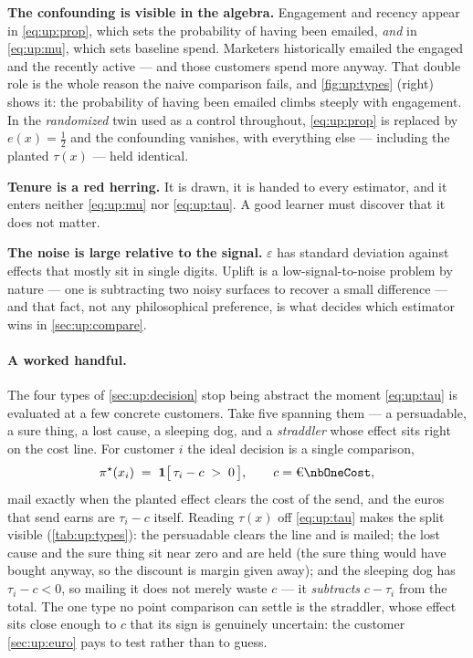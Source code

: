 \textbf{The confounding is visible in the algebra.} Engagement and recency appear in
\cref{eq:up:prop}, which sets the probability of having been emailed, \emph{and} in
\cref{eq:up:mu}, which sets baseline spend. Marketers historically emailed the engaged and the
recently active --- and those customers spend more anyway. That double role is the whole reason
the naive comparison fails, and \cref{fig:up:types} (right) shows it: the probability of having
been emailed climbs steeply with engagement. In the \emph{randomized} twin used as a control
throughout, \cref{eq:up:prop} is replaced by $e(x) = \tfrac12$ and the confounding vanishes,
with everything else --- including the planted $\tau(x)$ --- held identical.

\textbf{Tenure is a red herring.} It is drawn, it is handed to every estimator, and it enters
neither \cref{eq:up:mu} nor \cref{eq:up:tau}. A good learner must discover that it does not
matter.

\textbf{The noise is large relative to the signal.} $\varepsilon$ has standard deviation
 against effects that mostly sit in single digits. Uplift is a
low-signal-to-noise problem by nature --- one is subtracting two noisy surfaces to recover a
small difference --- and that fact, not any philosophical preference, is what decides which
estimator wins in \cref{sec:up:compare}.

\paragraph{A worked handful.} The four types of \cref{sec:up:decision} stop being abstract the
moment \cref{eq:up:tau} is evaluated at a few concrete customers. Take five spanning them --- a
persuadable, a sure thing, a lost cause, a sleeping dog, and a \emph{straddler} whose effect sits
right on the cost line. For customer $i$ the ideal decision is a single comparison,
%
\begin{equation}
  \pi^\star(x_i) \;=\; \mathbf 1\big[\,\tau_i - c \;>\; 0\,\big],
  \qquad c = \eur{\nbOneCost},
  \label{eq:up:oracle}
\end{equation}
%
mail exactly when the planted effect clears the cost of the send, and the euros that send earns are
$\tau_i - c$ itself. Reading $\tau(x)$ off \cref{eq:up:tau} makes the split visible
(\cref{tab:up:types}): the persuadable clears the line and is mailed; the lost cause and the sure
thing sit near zero and are held (the sure thing would have bought anyway, so the discount is margin
given away); and the sleeping dog has $\tau_i - c < 0$, so mailing it does not merely waste $c$ ---
it \emph{subtracts} $c - \tau_i$ from the total. The one type no point comparison can settle is the
straddler, whose effect sits close enough to $c$ that its sign is genuinely uncertain: the customer
\cref{sec:up:euro} pays to test rather than to guess.

